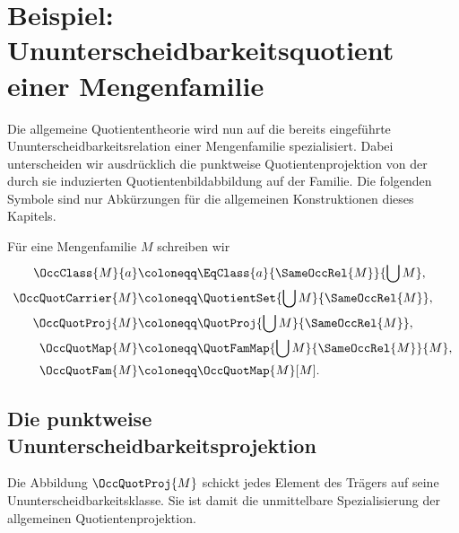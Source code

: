 \documentclass[main.tex]{subfiles}
\begin{document}
\section{Beispiel: Ununterscheidbarkeitsquotient einer Mengenfamilie}

Die allgemeine Quotiententheorie wird nun auf die bereits eingeführte
Ununterscheidbarkeitsrelation einer Mengenfamilie spezialisiert. Dabei
unterscheiden wir ausdrücklich die punktweise Quotientenprojektion von der
durch sie induzierten Quotientenbildabbildung auf der Familie. Die folgenden
Symbole sind nur Abkürzungen für die allgemeinen Konstruktionen dieses
Kapitels.

\begin{notation*}
Für eine Mengenfamilie \(M\) schreiben wir
\[
  \begin{aligned}
    \OccClass{M}{a}
      &\coloneqq \EqClass{a}{\SameOccRel{M}}{\bigcup M},\\
    \OccQuotCarrier{M}
      &\coloneqq \QuotientSet{\bigcup M}{\SameOccRel{M}},\\
    \OccQuotProj{M}
      &\coloneqq \QuotProj{\bigcup M}{\SameOccRel{M}},\\
    \OccQuotMap{M}
      &\coloneqq \QuotFamMap{\bigcup M}{\SameOccRel{M}}{M},\\
    \OccQuotFam{M}
      &\coloneqq \OccQuotMap{M}[M].
  \end{aligned}
\]
\end{notation*}

\subsection{Die punktweise Ununterscheidbarkeitsprojektion}

Die Abbildung \(\OccQuotProj{M}\) schickt jedes Element des Trägers auf seine
Ununterscheidbarkeitsklasse. Sie ist damit die unmittelbare Spezialisierung
der allgemeinen Quotientenprojektion.

\begin{tabproof}
\end{tabproof}
\end{document}
